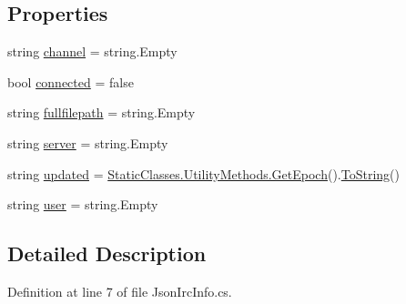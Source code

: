 \subsection*{Properties}
\begin{DoxyCompactItemize}
\item 
string \mbox{\hyperlink{class_little_weeb_library_1_1_models_1_1_json_irc_info_a46923aa9571dd4bde668025966e1904f}{channel}} = string.\+Empty
\item 
bool \mbox{\hyperlink{class_little_weeb_library_1_1_models_1_1_json_irc_info_aaf8e6e15c209ac7dca0fc8e581a052b4}{connected}} = false
\item 
string \mbox{\hyperlink{class_little_weeb_library_1_1_models_1_1_json_irc_info_aacacd27f11b2a0a075696b51d2a2a068}{fullfilepath}} = string.\+Empty
\item 
string \mbox{\hyperlink{class_little_weeb_library_1_1_models_1_1_json_irc_info_a74320be514974ef57a3f5cb879a0bb09}{server}} = string.\+Empty
\item 
string \mbox{\hyperlink{class_little_weeb_library_1_1_models_1_1_json_irc_info_a3c8dbe0b5446adae3c11792df96ea7df}{updated}} = \mbox{\hyperlink{class_little_weeb_library_1_1_static_classes_1_1_utility_methods_a12336d9e64983ddabaad8950486fafb2}{Static\+Classes.\+Utility\+Methods.\+Get\+Epoch}}().\mbox{\hyperlink{class_little_weeb_library_1_1_models_1_1_json_irc_info_a7a9635e9efc6d62801ec57bdb90c1cee}{To\+String}}()
\item 
string \mbox{\hyperlink{class_little_weeb_library_1_1_models_1_1_json_irc_info_a7deaa62c6b0192080e313c25dfa44ba5}{user}} = string.\+Empty
\end{DoxyCompactItemize}


\subsection{Detailed Description}


Definition at line 7 of file Json\+Irc\+Info.\+cs.



